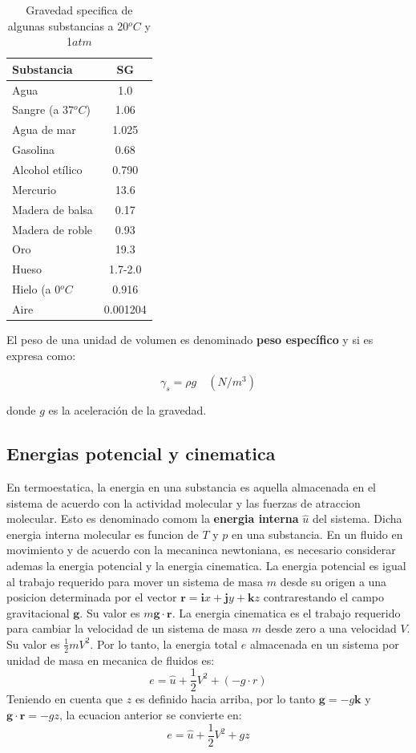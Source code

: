 \documentclass[10pt, oneside]{article}
\begin{document}
\begin{table}[h!]
\centering
\begin{tabular}{l c}
 \hline
 Substancia & SG \\ [0.5ex]
 \hline\hline
 Agua &  1.0  \\ 
 Sangre (a 37$^oC$) &  1.06  \\ 
 Agua de mar &  1.025 \\ 
 Gasolina &  0.68 \\ 
 Alcohol et\'ilico &  0.790  \\ 
 Mercurio &  13.6  \\ 
 Madera de balsa &  0.17  \\ 
 Madera de roble &  0.93  \\ 
 Oro &  19.3  \\ 
 Hueso &  1.7-2.0  \\ 
 Hielo (a 0$^oC$ &  0.916  \\ 
 Aire & 0.001204  \\ [1ex]
 \hline
\end{tabular}
\caption{Gravedad specifica de algunas substancias a 20$^oC$ y 1$atm$}
\label{t1}
\end{table}


El peso de una unidad de volumen es denominado \textbf{peso espec\'ifico} y si es expresa como:

\begin{equation}
\gamma_s = \rho g \quad (N/m^3)
\end{equation}

donde $g$ es la aceleraci\'on de la gravedad. 

\subsection{Energias potencial y cinematica}
En termoestatica, la energia en una substancia es aquella almacenada en el sistema de acuerdo con la actividad molecular y las fuerzas de atraccion molecular. Esto es denominado comom la \textbf{energia interna} $\hat{u}$ del sistema. Dicha energia interna molecular es funcion de $T$ y $p$ en una substancia. En un fluido en movimiento y de acuerdo con la mecaninca newtoniana, es necesario considerar ademas la energia potencial y la energia cinematica. La energia potencial es igual al trabajo requerido para mover un sistema de masa $m$ desde su origen a una posicion determinada por el vector $\mathbf{r}=\mathbf{i}x + \mathbf{j}y + \mathbf{k}z$ contrarestando el campo gravitacional $\mathbf{g}$. Su valor es $m\mathbf{g}\cdot \mathbf{r}$. La energia cinematica es el trabajo requerido para cambiar la velocidad de un sistema de masa $m$ desde zero a una velocidad $V$. Su valor es $\frac{1}{2}mV^2$. Por lo tanto, la energia total $e$ almacenada en un sistema por unidad de masa en mecanica de fluidos es:
$$
e=\hat{u}+\frac{1}{2}V^2 + (-g\cdot r)
$$
Teniendo en cuenta que $z$ es definido hacia arriba, por lo tanto $\mathbf{g}=-g\mathbf{k}$ y $\mathbf{g}\cdot \mathbf{r}=-gz$, la ecuacion anterior se convierte en:
$$
e=\hat{u}+\frac{1}{2}V^2 + gz
$$
\end{document}
